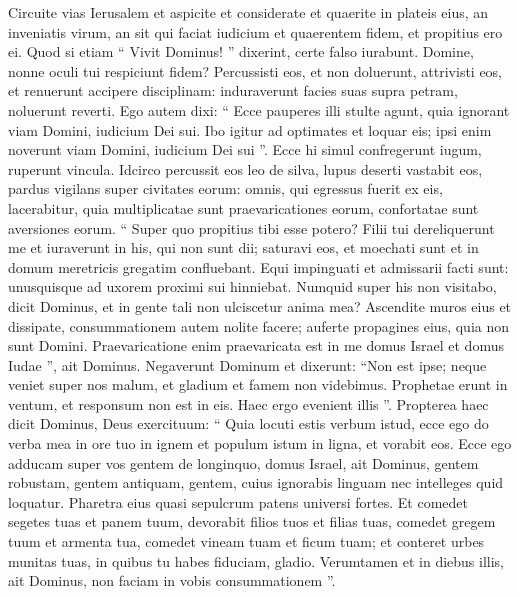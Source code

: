 \begin{biblechapter}
\begin{biblechapter}
\begin{biblechapter}
\begin{biblechapter}
\begin{biblechapter}
\verse Circuite vias Ierusalem
 et aspicite et considerate
 et quaerite in plateis eius,
 an inveniatis virum,
 an sit qui faciat iudicium et quaerentem fidem,
 et propitius ero ei.
 \verse Quod si etiam “ Vivit Dominus! ” dixerint,
 certe falso iurabunt.
 \verse Domine, nonne oculi tui respiciunt fidem?
 Percussisti eos, et non doluerunt,
 attrivisti eos, et renuerunt accipere disciplinam:
 induraverunt facies suas supra petram,
 noluerunt reverti.
 \verse Ego autem dixi: “ Ecce pauperes illi stulte agunt,
 quia ignorant viam Domini,
 iudicium Dei sui.
 \verse Ibo igitur ad optimates
 et loquar eis;
 ipsi enim noverunt viam Domini,
 iudicium Dei sui ”.
 Ecce hi simul confregerunt iugum, ruperunt vincula.
 \verse Idcirco percussit eos leo de silva,
 lupus deserti vastabit eos,
 pardus vigilans super civitates eorum:
 omnis, qui egressus fuerit ex eis, lacerabitur,
 quia multiplicatae sunt praevaricationes eorum,
 confortatae sunt aversiones eorum. 
\verse “ Super quo propitius tibi esse potero?
 Filii tui dereliquerunt me
 et iuraverunt in his, qui non sunt dii;
 saturavi eos, et moechati sunt
 et in domum meretricis gregatim confluebant.
 \verse Equi impinguati et admissarii facti sunt:
 unusquisque ad uxorem proximi sui hinniebat.
 \verse Numquid super his non visitabo,
 dicit Dominus,
 et in gente tali non ulciscetur anima mea?
 \verse Ascendite muros eius et dissipate,
 consummationem autem nolite facere;
 auferte propagines eius,
 quia non sunt Domini.
 \verse Praevaricatione enim praevaricata est in me
 domus Israel et domus Iudae ”,
 ait Dominus.
 \verse Negaverunt Dominum
 et dixerunt: “Non est ipse;
 neque veniet super nos malum,
 et gladium et famem non videbimus.
 \verse Prophetae erunt in ventum,
 et responsum non est in eis.
 Haec ergo evenient illis ”.
 \verse Propterea haec dicit Dominus, Deus exercituum:
 “ Quia locuti estis verbum istud,
 ecce ego do verba mea in ore tuo in ignem
 et populum istum in ligna,
 et vorabit eos.
 \verse Ecce ego adducam super vos gentem de longinquo,
 domus Israel,
 ait Dominus,
 gentem robustam,
 gentem antiquam,
 gentem, cuius ignorabis linguam
 nec intelleges quid loquatur.
 \verse Pharetra eius quasi sepulcrum patens
 universi fortes.
 \verse Et comedet segetes tuas et panem tuum,
 devorabit filios tuos et filias tuas,
 comedet gregem tuum et armenta tua,
 comedet vineam tuam et ficum tuam;
 et conteret urbes munitas tuas,
 in quibus tu habes fiduciam, gladio.
 \verse Verumtamen et in diebus illis,
 ait Dominus,
 non faciam in vobis consummationem ”.

\end{biblechapter}
\end{biblechapter}
\end{biblechapter}
\end{biblechapter}
\end{biblechapter}
